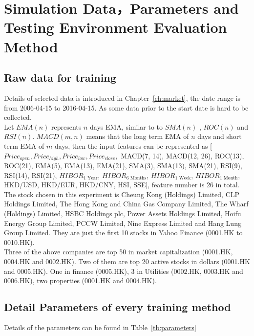 \chapter{Simulation Data，Parameters and Testing Environment Evaluation Method}
\label{ch:data&model}

\section{Raw data for training}
Details of selected data is introduced in Chapter~\ref{ch:market}, the date range is from 2006-04-15 to 2016-04-15. As some data prior to the start date is hard to be collected. \\


Let $ EMA(n) $ represents $ n $ days EMA, similar to to $ SMA(n) $ , $ ROC(n) $ and $ RSI(n) $. $ MACD(m, n) $ means that the long term EMA of $ n $ days and short term EMA of $ m $ days, then the input features can be represented as [$ Price_{open}, Price_{high}, Price_{low}, Price_{close}, $ MACD(7, 14), MACD(12, 26), ROC(13), ROC(21), EMA(5), EMA(13), EMA(21), SMA(3), SMA(13), SMA(21), RSI(9), RSI(14), RSI(21), $ HIBOR_{\text{1 Year}} $, $ HIBOR_{\text{6 Months}} $, $ HIBOR_{\text{1 Week}} $, $ HIBOR_{\text{1 Month}} $, HKD/USD, HKD/EUR, HKD/CNY, HSI, SSE], feature number is 26 in total.\\


The stock chosen in this experiment is Cheung Kong (Holdings) Limited, CLP Holdings Limited, The Hong Kong and China Gas Company Limited, The Wharf (Holdings) Limited, HSBC Holdings plc, Power Assets Holdings Limited, Hoifu Energy Group Limited, PCCW Limited, Nine Express Limited and Hang Lung Group Limited. They are just the first 10 stocks in Yahoo Finance (0001.HK to 0010.HK).\\


Three of the above companies are top 50 in market capitalization (0001.HK, 0004.HK and 0002.HK). Two of them are top 20 active stocks in dollars (0001.HK and 0005.HK). One in finance (0005.HK), 3 in Utilities (0002.HK, 0003.HK and 0006.HK), two properties (0001.HK and 0004.HK).


\section{Detail Parameters of every training method}
Details of the parameters can be found in Table~\ref{tb:parameters}

